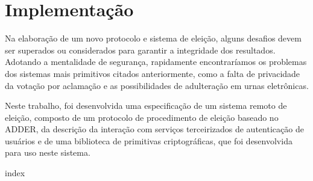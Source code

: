 \chapter{Implementação}
\label{ch:implementação}

Na elaboração de um novo protocolo e sistema de eleição, alguns desafios devem
ser superados ou considerados para garantir a integridade dos resultados.
Adotando a mentalidade de segurança, rapidamente encontraríamos os problemas
dos sistemas mais primitivos citados anteriormente, como a falta de privacidade
da votação por aclamação e as possibilidades de adulteração em urnas
eletrônicas.

Neste trabalho, foi desenvolvida uma especificação de um sistema remoto de
eleição, composto de um protocolo de procedimento de eleição baseado no ADDER,
da descrição da interação com serviços terceirizados de autenticação de
usuários e de uma biblioteca de primitivas criptográficas, que foi desenvolvida
para uso neste sistema.




{index}



